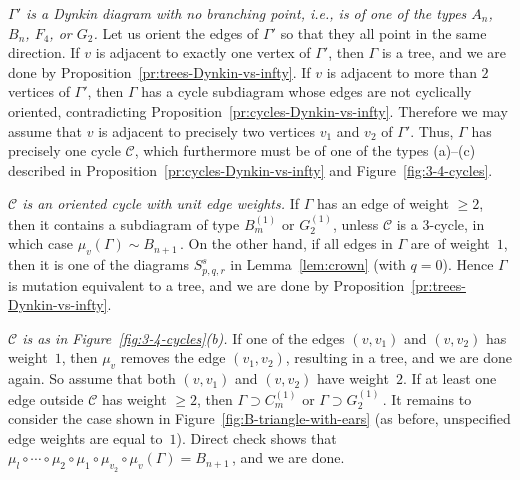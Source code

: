 \documentclass[letterpaper]{amsart}
\numberwithin{equation}{section}
\theoremstyle{definition}
\newcommand{\credit}[1]{\smallskip\noindent {\textbf{#1.\ }}}
\begin{document}
\credit{Case 1} 
\emph{$\Gamma'$ is a Dynkin diagram 
with no branching point, i.e., is 
of one of the types $A_n$, $B_n$, $F_4$, or $G_2$.} 
Let us orient the edges of $\Gamma'$ so that they all point in the 
same direction. 
If $v$ is adjacent to exactly one vertex of $\Gamma'$, then 
$\Gamma$ is a tree, and we are done by 
Proposition~\ref{pr:trees-Dynkin-vs-infty}. 
If $v$ is adjacent to more than $2$ vertices of $\Gamma'$, then 
$\Gamma$ has a cycle subdiagram whose edges are not cyclically 
oriented, contradicting Proposition~\ref{pr:cycles-Dynkin-vs-infty}. 
Therefore we may assume that $v$ is adjacent to precisely two vertices 
$v_1$ and $v_2$ of $\Gamma'$. 
Thus, $\Gamma$ has precisely one cycle $\mathcal{C}$, which 
furthermore must be of one of the types (a)--(c) described in 
Proposition~\ref{pr:cycles-Dynkin-vs-infty} and Figure~\ref{fig:3-4-cycles}. 
 
\credit{Subcase 1.1} 
\emph{$\mathcal{C}$ is an oriented cycle with unit edge weights.} 
If $\Gamma$ has an edge of weight $\geq 2$, then it contains a 
subdiagram of type $B_m^{(1)}$ or $G_2^{(1)}$, unless $\mathcal{C}$ is 
a $3$-cycle, in which case $\mu_v(\Gamma)\sim B_{n+1}\,$. 
On the other hand, if all edges in $\Gamma$ are of weight~$1$, then it is one of 
the diagrams $S_{p,q,r}^s$ in Lemma~\ref{lem:crown} (with $q=0$). 
Hence $\Gamma$ is mutation equivalent to a tree, and we are done by 
Proposition~\ref{pr:trees-Dynkin-vs-infty}. 
 
\credit{Subcase 1.2} 
\emph{$\mathcal{C}$ is as in 
Figure~\ref{fig:3-4-cycles}(b).} 
If one of the edges $(v,v_1)$ and $(v,v_2)$ has weight~$1$, 
then $\mu_v$ removes the edge $(v_1, v_2)$, resulting in a tree, and 
we are done again. 
So assume that both $(v,v_1)$ and $(v,v_2)$ have weight~$2$. 
If at least one edge outside $\mathcal{C}$ 
has weight $\geq 2$, then $\Gamma\supset C_m^{(1)}$ or 
$\Gamma\supset G_2^{(1)}\,$. 
It remains to consider the case shown in Figure~\ref{fig:B-triangle-with-ears} 
(as before, unspecified edge weights are equal to~$1$). 
Direct check shows that 
$\mu_l \circ \cdots \circ \mu_2 \circ \mu_1 \circ \mu_{v_2} 
\circ \mu_v(\Gamma)=B_{n+1}\,$, and we are done. 
 
 
 
\end{document}
